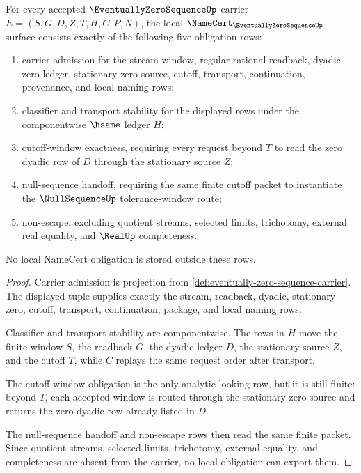 \begin{theorem}
\label{thm:eventually-zero-sequence-namecert-obligations}
For every accepted $\EventuallyZeroSequenceUp$ carrier $E=(S,G,D,Z,T,H,C,P,N)$, the local $\NameCert_{\EventuallyZeroSequenceUp}$ surface consists exactly of the following five obligation rows:
\begin{enumerate}
\item carrier admission for the stream window, regular rational readback, dyadic zero ledger, stationary zero source, cutoff, transport, continuation, provenance, and local naming rows;
\item classifier and transport stability for the displayed rows under the componentwise $\hsame$ ledger $H$;
\item cutoff-window exactness, requiring every request beyond $T$ to read the zero dyadic row of $D$ through the stationary source $Z$;
\item null-sequence handoff, requiring the same finite cutoff packet to instantiate the $\NullSequenceUp$ tolerance-window route;
\item non-escape, excluding quotient streams, selected limits, trichotomy, external real equality, and $\RealUp$ completeness.
\end{enumerate}
No local NameCert obligation is stored outside these rows.
\end{theorem}
\begin{proof}
Carrier admission is projection from \autoref{def:eventually-zero-sequence-carrier}. The displayed tuple supplies exactly the stream, readback, dyadic, stationary zero, cutoff, transport, continuation, package, and local naming rows.

Classifier and transport stability are componentwise. The rows in $H$ move the finite window $S$, the readback $G$, the dyadic ledger $D$, the stationary source $Z$, and the cutoff $T$, while $C$ replays the same request order after transport.

The cutoff-window obligation is the only analytic-looking row, but it is still finite: beyond $T$, each accepted window is routed through the stationary zero source and returns the zero dyadic row already listed in $D$.

The null-sequence handoff and non-escape rows then read the same finite packet. Since quotient streams, selected limits, trichotomy, external equality, and completeness are absent from the carrier, no local obligation can export them.
\end{proof}

